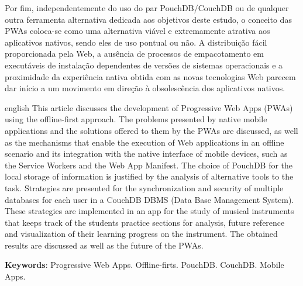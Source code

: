 \documentclass[
	article,			%
	11pt,				%
	oneside,			%
	a4paper,			%
	english,			%
	brazil,				%
	sumario=tradicional
	]{abntex2}
\begin{document}
Por fim, independentemente do uso do par PouchDB/CouchDB ou de qualquer outra ferramenta alternativa dedicada aos objetivos deste estudo, o conceito das PWAs coloca-se como uma alternativa viável e extremamente atrativa aos aplicativos nativos, sendo eles de uso pontual ou não. A distribuição fácil proporcionada pela Web, a ausência de processos de empacotamento em executáveis de instalação dependentes de versões de sistemas operacionais e a proximidade da experiência nativa obtida com as novas tecnologias Web parecem dar início a um movimento em direção à obsolescência dos aplicativos nativos.

\postextual



\emptythanks
\maketitle

\renewcommand{\resumoname}{Abstract}
\begin{resumoumacoluna}
 \begin{otherlanguage*}{english}
   This article discusses the development of Progressive Web Apps (PWAs) using
   the offline-first approach. The problems presented by native mobile applications and the solutions offered to them by the PWAs are discussed, as well as the mechanisms that enable the execution of Web applications in an offline scenario and its integration with the native interface of mobile devices, such as the Service Workers and the
   Web App Manifest. The choice of PouchDB for the local storage of information
   is justified by the analysis of alternative tools to the task. Strategies are
   presented for the synchronization and security of multiple databases for
   each user in a CouchDB DBMS (Data Base Management System). These strategies are implemented in an app for the study of musical instruments that keeps track of the students practice sections for analysis, future reference and visualization of their learning progress on the instrument. The obtained results are discussed as well as the future of the PWAs. 

   \vspace{\onelineskip}
 
   \noindent
   \textbf{Keywords}: Progressive Web Apps. Offline-firts. PouchDB. CouchDB. Mobile Apps.
 \end{otherlanguage*}  
\end{resumoumacoluna}



\end{document}
